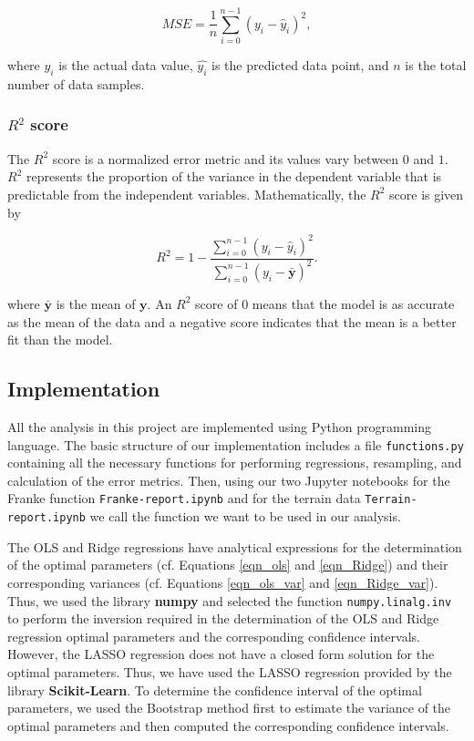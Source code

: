 \documentclass[a4paper]{article}
\begin{document}
\begin{equation}
    MSE = \frac{1}{n}
    \sum_{i=0}^{n-1}(y_i-\hat{y}_i)^2,
    \label{eq:MSE}
\end{equation}

where $y_i$ is the actual data value, $\hat{y_i}$ is the predicted data point, and $n$ is the total number of data samples.

\subsubsection*{$R^2$ score}

The $R^2$ score is a normalized error metric and its values vary between $0$ and $1$. $R^2$ represents the proportion of the variance in the dependent variable that is predictable from the independent variables. Mathematically, the $R^2$ score is given by

\begin{equation}
    R^2 = 1 - \frac{\sum_{i=0}^{n - 1} (y_i - \hat{y}_i)^2}{\sum_{i=0}^{n - 1} (y_i - \bar{\mathbf{y}})^2}.
    \label{eq:R2}
\end{equation}

where $\bar{\mathbf{y}}$ is the mean of $\mathbf{y}$. An $R^2$ score of $0$ means that the model is as accurate as the mean of the data and a negative score indicates that the mean is a better fit than the model.

\subsection{Implementation}
All the analysis in this project are implemented using Python programming language. The basic structure of our implementation includes a file \texttt{functions.py} containing all the necessary functions for performing regressions, resampling, and calculation of the error metrics. Then, using our two Jupyter notebooks for the Franke function \texttt{Franke-report.ipynb} and for the terrain data \texttt{Terrain-\\report.ipynb} we call the function we want to be used in our analysis. 

The OLS and Ridge regressions have analytical expressions for the determination of the optimal parameters (cf. Equations \ref{eqn_ols} and \ref{eqn_Ridge}) and their corresponding variances (cf. Equations \ref{eqn_ols_var} and \ref{eqn_Ridge_var}). Thus, we used the library \textbf{numpy} and selected the function \texttt{numpy.linalg.inv} to perform the inversion required in the determination of the OLS and Ridge regression optimal parameters and the corresponding confidence intervals. However, the LASSO regression does not have a closed form solution for the optimal parameters. Thus, we have used the LASSO regression provided by the library \textbf{Scikit-Learn}. To determine the confidence interval of the optimal parameters, we used the Bootstrap method first to estimate the variance of the optimal parameters and then computed the corresponding confidence intervals.
\end{document}
